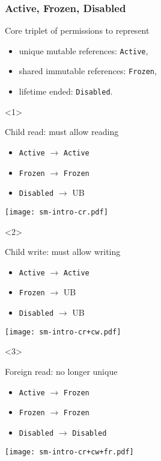 \begin{frame}[t]
    \frametitle{Active, Frozen, Disabled}
    Core triplet of permissions to represent
    \begin{itemize}
        \item unique mutable references: \texttt{Active},
        \item shared immutable references: \texttt{Frozen},
        \item lifetime ended: \texttt{Disabled}.
    \end{itemize}

    \begin{onlyenv}<1>
        \begin{block}{Child read: must allow reading}
            \begin{itemize}
                \item \texttt{Active} \(\to\) \texttt{Active}
                \item \texttt{Frozen} \(\to\) \texttt{Frozen}
                \item \texttt{Disabled} \(\to\) UB
            \end{itemize}
        \end{block}
        \texttt{[image: sm-intro-cr.pdf]}
    \end{onlyenv}

    \begin{onlyenv}<2>
        \begin{block}{Child write: must allow writing}
            \begin{itemize}
                \item \texttt{Active} \(\to\) \texttt{Active}
                \item \texttt{Frozen} \(\to\) UB
                \item \texttt{Disabled} \(\to\) UB
            \end{itemize}
        \end{block}
        \texttt{[image: sm-intro-cr+cw.pdf]}
    \end{onlyenv}

    \begin{onlyenv}<3>
        \begin{block}{Foreign read: no longer unique}
            \begin{itemize}
                \item \texttt{Active} \(\to\) \texttt{Frozen}
                \item \texttt{Frozen} \(\to\) \texttt{Frozen}
                \item \texttt{Disabled} \(\to\) \texttt{Disabled}
            \end{itemize}
        \end{block}
        \texttt{[image: sm-intro-cr+cw+fr.pdf]}
    \end{onlyenv}


\end{frame}
